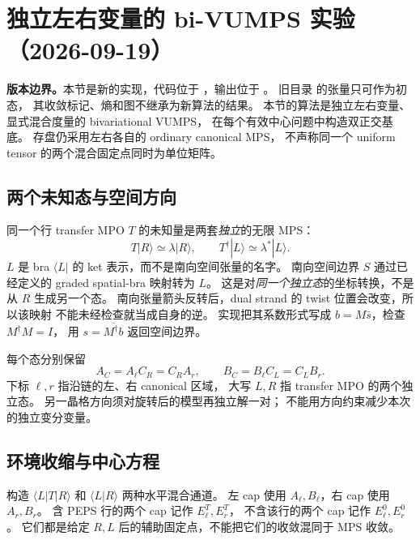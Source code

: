 \section{独立左右变量的 bi-VUMPS 实验（2026-09-19）}
\label{sec:independent-bivumps}

\textbf{版本边界。}本节是新的实现，代码位于
，输出位于
。
旧目录  的张量只可作为初态，
其收敛标记、熵和图不继承为新算法的结果。
本节的算法是独立左右变量、显式混合度量的 bivariational VUMPS，
在每个有效中心问题中构造双正交基底。
存盘仍采用左右各自的 ordinary canonical MPS，
不声称同一个 uniform tensor 的两个混合固定点同时为单位矩阵。

\subsection{两个未知态与空间方向}
同一个行 transfer MPO $T$ 的未知量是两套\emph{独立}的无限 MPS：
\[
 T|R\rangle\simeq\lambda|R\rangle,\qquad
 T^\dagger|L\rangle\simeq\lambda^*|L\rangle.
\]
$L$ 是 bra $\langle L|$ 的 ket 表示，而不是南向空间张量的名字。
南向空间边界 $S$ 通过已经定义的 graded spatial-bra 映射转为 $L$。
这是对\emph{同一个独立态}的坐标转换，不是从 $R$ 生成另一个态。
南向张量箭头反转后，dual strand 的 twist 位置会改变，所以该映射
不能未经检查就当成自身的逆。
实现把其系数形式写成 $b=M\bar s$，检查 $M^\dagger M=I$，
用 $s=\overline{M^\dagger b}$ 返回空间边界。

每个态分别保留
\[
 A_C=A_\ell C_R=C_R A_r,\qquad
 B_C=B_\ell C_L=C_L B_r.
\]
下标 $\ell,r$ 指沿链的左、右 canonical 区域，
大写 $L,R$ 指 transfer MPO 的两个独立态。
另一晶格方向须对旋转后的模型再独立解一对；
不能用方向约束减少本次的独立变分变量。

\subsection{环境收缩与中心方程}
构造 $\langle L|T|R\rangle$ 和 $\langle L|R\rangle$ 两种水平混合通道。
左 cap 使用 $A_\ell,B_\ell$，右 cap 使用 $A_r,B_r$。
含 PEPS 行的两个 cap 记作 $E_\ell^T,E_r^T$，
不含该行的两个 cap 记作 $E_\ell^0,E_r^0$。
它们都是给定 $R,L$ 后的辅助固定点，不能把它们的收敛混同于 MPS 收敛。


